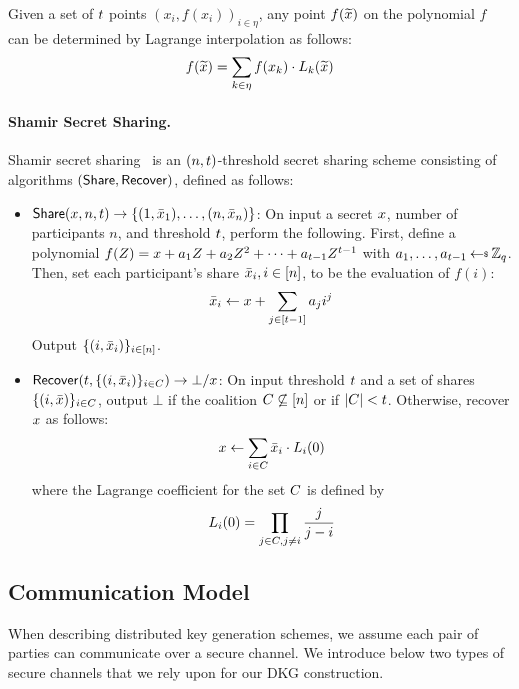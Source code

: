 Given a set of $t$ points $(x_i, f(x_i))_{i \in \eta}$,
any point $f(\widetilde{x})$ on the polynomial $f$ can be determined by Lagrange interpolation as follows:
\[
  f(\widetilde{x}) = \sum_{k \in \eta} f(x_k) \cdot L_k(\widetilde{x})
\]

\paragraph{Shamir Secret Sharing.}
Shamir secret sharing~\cite{Shamir79} is an $(n, t)$-threshold secret sharing scheme consisting of algorithms $(\mathsf{Share}, \allowbreak \mathsf{Recover})$, defined as follows:

\begin{itemize}[itemsep=1mm]
    \item $\mathsf{Share}(x, n, t) \rightarrow \{ (1, \bar{x}_1), \ldots, (n, \bar{x}_n)\}$:
      On input a secret $x$, number of participants $n$, and threshold $t$, perform the following.
First, define a polynomial $f(Z) = x + a_1 Z + a_2 Z^2 + \cdots + a_{t-1} Z^{t-1}$ with $a_1, \ldots, a_{\tcor} \randpick \Zq$.
Then, set each participant's share $\bar{x}_i, i \in [n]$, to be the evaluation of $f(i)$:
    \[
        \bar{x}_i \gets x + \sum_{j \in [t-1]} a_j i^j
      \]
%
    Output $\{(i, \bar{x}_i) \}_{i \in [n]}$.

  \item $ \mathsf{Recover}(t, \{ (i, \bar{x}_i)\}_{ i \in C}) \rightarrow \bot / x$:
    On input threshold $t$ and a set of shares
$\{(i, \bar{x}) \}_{i \in C}$,
    output $\bot$ if the coalition $C \not\subseteq [n]$ or if
$\lvert C \rvert < t$.
Otherwise, recover $x$ as follows:
  \[
      x \gets \sum_{i \in C} \bar{x}_i \cdot L_i(0)
  \]
    where the Lagrange coefficient for the set
$C$ is defined by
    \[
    L_i(0) = \prod_{j \in C, j\neq i} \frac{j}{j - i}
    \]
\end{itemize}


\subsection{Communication Model}
\label{sec:comm-model}

When describing distributed key generation schemes,
we assume each pair of parties can communicate over a secure channel.
We introduce below two types of secure channels that we rely upon for our DKG construction.


